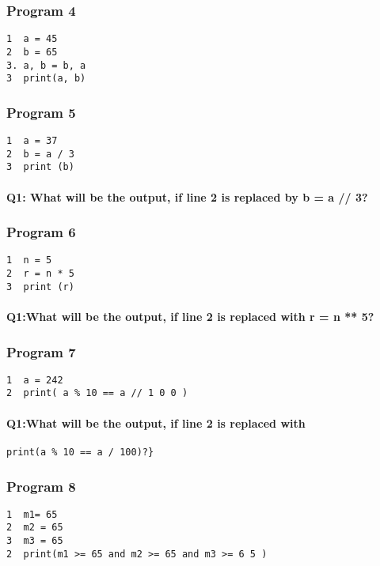 \documentclass{article}
\begin{document}
\subsubsection{Program 4}
\begin{verbatim}
1  a = 45
2  b = 65
3. a, b = b, a
3  print(a, b)
\end{verbatim}

\subsubsection{Program 5}
\begin{verbatim}
1  a = 37
2  b = a / 3
3  print (b)
\end{verbatim}
\paragraph{\textbf{Q1:} What will be the output, if line 2 is replaced by b = a // 3?}

\subsubsection{Program 6}
\begin{verbatim}
1  n = 5 
2  r = n * 5
3  print (r)
\end{verbatim}
\paragraph{\textbf{Q1:}What will be the output, if line 2 is replaced with r = n ** 5?}

\subsubsection{Program 7}
\begin{verbatim}
1  a = 242
2  print( a % 10 == a // 1 0 0 )
\end{verbatim}

\paragraph{\textbf{Q1:}What will be the output, if line 2 is replaced with }
\begin{verbatim}
print(a % 10 == a / 100)?}
\end{verbatim}

\subsubsection{Program 8}
\begin{verbatim}
1  m1= 65 
2  m2 = 65
3  m3 = 65
2  print(m1 >= 65 and m2 >= 65 and m3 >= 6 5 )
\end{verbatim}
\end{document}
